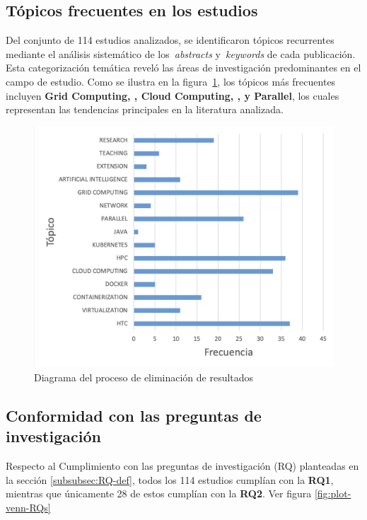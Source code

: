 \subsection{Tópicos frecuentes en los estudios}
\noindent

Del conjunto de 114 estudios analizados, se identificaron tópicos recurrentes mediante el análisis sistemático de los~\textit{abstracts} y~\textit{keywords} de cada publicación. Esta categorización temática reveló las áreas de investigación predominantes en el campo de estudio. Como se ilustra en la figura~\ref{fig:plot-topicos}, los tópicos más frecuentes incluyen \textbf{Grid Computing, \HPC, Cloud Computing, \HTC, y Parallel}, los cuales representan las tendencias principales en la literatura analizada.

\begin{figure}[H]
	\centering
	\includegraphics[scale=0.3] {tablas-images/sms/plot-topicos.png}
	\caption{Diagrama del proceso de eliminación de resultados}\label{fig:plot-topicos}
\end{figure}


\subsection{Conformidad con las preguntas de investigación}
Respecto al Cumplimiento con las preguntas de investigación (RQ) planteadas en la sección \ref{subsubsec:RQ-def}, todos los 114 estudios cumplían con la \textbf{RQ1}, mientras que únicamente 28 de estos cumplían con la \textbf{RQ2}. Ver figura \ref{fig:plot-venn-RQs}

